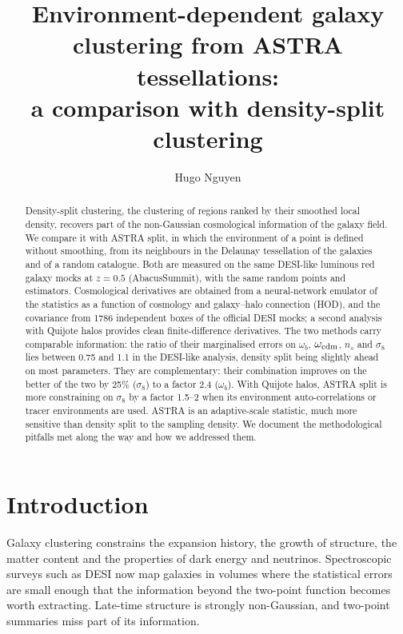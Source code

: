 \documentclass[11pt,twocolumn]{article}
\title{Environment-dependent galaxy clustering from ASTRA tessellations:\\
a comparison with density-split clustering}
\author{Hugo Nguyen}
\date{}
\begin{document}
\maketitle

\begin{abstract}
Density-split clustering, the clustering of regions ranked by their smoothed local density, recovers part of the non-Gaussian cosmological information of the galaxy field. We compare it with ASTRA split, in which the environment of a point is defined without smoothing, from its neighbours in the Delaunay tessellation of the galaxies and of a random catalogue. Both are measured on the same DESI-like luminous red galaxy mocks at $z=0.5$ (AbacusSummit), with the same random points and estimators. Cosmological derivatives are obtained from a neural-network emulator of the statistics as a function of cosmology and galaxy--halo connection (HOD), and the covariance from 1786 independent boxes of the official DESI mocks; a second analysis with Quijote halos provides clean finite-difference derivatives. The two methods carry comparable information: the ratio of their marginalised errors on $\omega_b$, $\omega_{\rm cdm}$, $n_s$ and $\sigma_8$ lies between 0.75 and 1.1 in the DESI-like analysis, density split being slightly ahead on most parameters. They are complementary: their combination improves on the better of the two by 25\% ($\sigma_8$) to a factor 2.4 ($\omega_b$). With Quijote halos, ASTRA split is more constraining on $\sigma_8$ by a factor 1.5--2 when its environment auto-correlations or tracer environments are used. ASTRA is an adaptive-scale statistic, much more sensitive than density split to the sampling density. We document the methodological pitfalls met along the way and how we addressed them.
\end{abstract}

\section{Introduction}

Galaxy clustering constrains the expansion history, the growth of structure, the matter content and the properties of dark energy and neutrinos. Spectroscopic surveys such as DESI now map galaxies in volumes where the statistical errors are small enough that the information beyond the two-point function becomes worth extracting. Late-time structure is strongly non-Gaussian, and two-point summaries miss part of its information.
\end{document}
